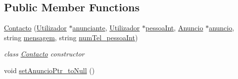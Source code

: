 \subsection*{Public Member Functions}
\begin{DoxyCompactItemize}
\item 
\hyperlink{class_contacto_af3d7e17b38f1c9dcf239b92b47f9d1fa}{Contacto} (\hyperlink{class_utilizador}{Utilizador} $\ast$\hyperlink{class_contacto_a77aa3267764f1deae040ab8d3a09cf9a}{anunciante}, \hyperlink{class_utilizador}{Utilizador} $\ast$\hyperlink{class_contacto_a30bc3e0baecefc67118e591858b5da4c}{pessoa\+Int}, \hyperlink{class_anuncio}{Anuncio} $\ast$\hyperlink{class_contacto_a5cb4811ded2eea7ac9645acb1553b410}{anuncio}, string \hyperlink{class_contacto_a5df8ad3ac8609cee665c21a2fa2a3e6a}{mensagem}, string \hyperlink{class_contacto_a87b5fa8d59ad7b8596eb1d48bfb405df}{num\+Tel\+\_\+pessoa\+Int})
\begin{DoxyCompactList}\small\item\em class \hyperlink{class_contacto}{Contacto} constructor \end{DoxyCompactList}\item 
\hypertarget{class_contacto_a3be07cbbddb82a3e5eb7bd3fcaed2f50}{}void \hyperlink{class_contacto_a3be07cbbddb82a3e5eb7bd3fcaed2f50}{set\+Anuncio\+Ptr\+\_\+to\+Null} ()\label{class_contacto_a3be07cbbddb82a3e5eb7bd3fcaed2f50}


\end{DoxyCompactItemize}
